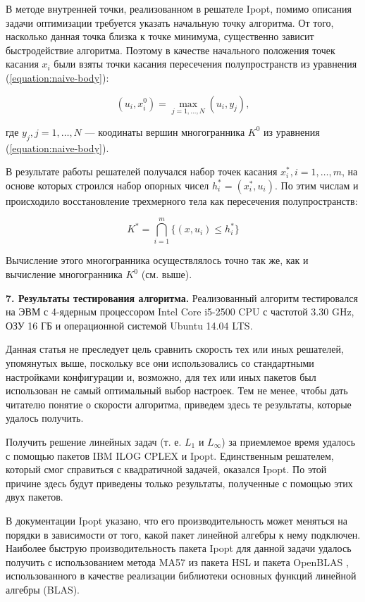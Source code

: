 \documentclass[a4paper, 10pt]{article}
\theoremstyle{definition}
\theoremstyle{plain}
\theoremstyle{plain}
\begin{document}
В методе внутренней точки, реализованном в решателе Ipopt, помимо описания
задачи оптимизации требуется указать начальную точку алгоритма. От того,
насколько данная точка близка к точке минимума, существенно зависит
быстродействие алгоритма. Поэтому в качестве начального положения точек касания
$x_{i}$ были взяты точки касания пересечения полупространств из уравнения
(\ref{equation:naive-body}):

\begin{equation*}
 (u_{i}, x^{0}_{i}) = \max \limits_{j = 1, \ldots, N} (u_{i}, y_{j}),
\end{equation*}

где $y_{j}, j = 1, \ldots, N$ --- коодинаты вершин многогранника $K^{0}$ из
уравнения (\ref{equation:naive-body}).

В результате работы решателей получался набор точек касания
$x^{*}_{i}, i = 1, \ldots, m$, на основе которых строился набор опорных чисел
$h^{*}_{i} = (x^{*}_{i}, u_{i})$. По этим числам и происходило восстановление
трехмерного тела как пересечения полупространств:

\begin{equation*}
 K^{*} = \bigcap \limits_{i = 1}^{m} \{(x, u_{i}) \leq h^{*}_{i}\}
\end{equation*}

Вычисление этого многогранника осуществлялось точно так же, как и вычисление
многогранника $K^{0}$ (см. выше).

\textbf{7. Результаты тестирования алгоритма.}
Реализованный алгоритм тестировался на ЭВМ с 4-ядерным процессором
Intel Core i5-2500 CPU с частотой 3.30 GHz, ОЗУ 16 ГБ и операционной
системой Ubuntu 14.04 LTS.

Данная статья не преследует цель сравнить скорость тех или иных решателей,
упомянутых выше, поскольку все они использовались со стандартными настройками
конфигурации и, возможно, для тех или иных пакетов был использован не самый
оптимальный выбор настроек. Тем не менее, чтобы дать читателю понятие о
скорости алгоритма, приведем здесь те результаты, которые удалось получить.

Получить решение линейных задач (т. е. $L_{1}$ и $L_{\infty}$) за приемлемое
время удалось с помощью пакетов IBM ILOG CPLEX и Ipopt. Единственным решателем,
который смог справиться с квадратичной задачей, оказался Ipopt. По этой причине
здесь будут приведены только результаты, полученные с помощью этих двух пакетов.

В документации Ipopt указано, что его производительность может меняться на
порядки в зависимости от того, какой пакет линейной алгебры к нему подключен.
Наиболее быструю производительность пакета Ipopt для данной задачи удалось
получить с использованием метода MA57 из пакета HSL \cite{hsl} и пакета
OpenBLAS \cite{xianyi2013openblas}, использованного в качестве реализации
библиотеки основных функций линейной алгебры (BLAS).
\end{document}
